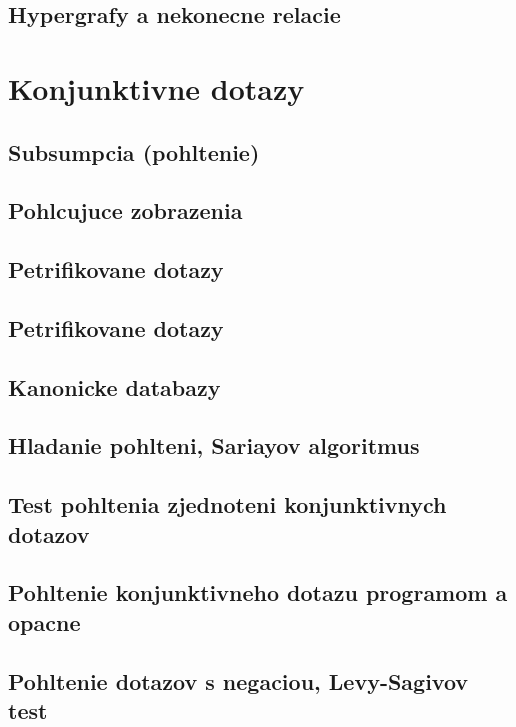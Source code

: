 \documentclass[12pt,a4paper]{article}
\begin{document}
\subsection{Hypergrafy a nekonecne relacie}

\section{Konjunktivne dotazy}

\subsection{Subsumpcia (pohltenie)}

\subsection{Pohlcujuce zobrazenia}

\subsection{Petrifikovane dotazy}

\subsection{Petrifikovane dotazy}

\subsection{Kanonicke databazy}

\subsection{Hladanie pohlteni, Sariayov algoritmus}

\subsection{Test pohltenia zjednoteni konjunktivnych dotazov}

\subsection{Pohltenie konjunktivneho dotazu programom a opacne}

\subsection{Pohltenie dotazov s negaciou, Levy-Sagivov test}
\end{document}
